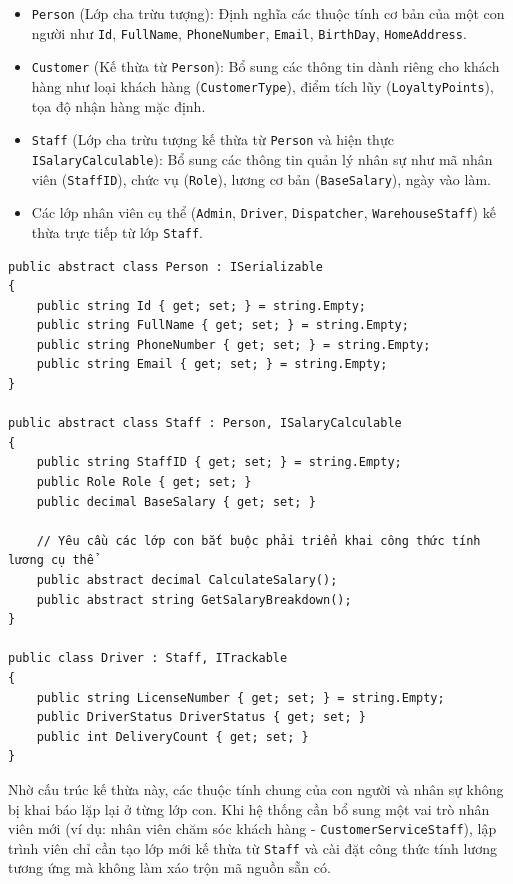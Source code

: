 \documentclass[12pt,a4paper]{article}
\begin{document}
\begin{itemize}[leftmargin=1.2cm]
    \item \texttt{Person} (Lớp cha trừu tượng): Định nghĩa các thuộc tính cơ bản của một con người như \texttt{Id}, \texttt{FullName}, \texttt{PhoneNumber}, \texttt{Email}, \texttt{BirthDay}, \texttt{HomeAddress}.
    \item \texttt{Customer} (Kế thừa từ \texttt{Person}): Bổ sung các thông tin dành riêng cho khách hàng như loại khách hàng (\texttt{CustomerType}), điểm tích lũy (\texttt{LoyaltyPoints}), tọa độ nhận hàng mặc định.
    \item \texttt{Staff} (Lớp cha trừu tượng kế thừa từ \texttt{Person} và hiện thực \texttt{ISalaryCalculable}): Bổ sung các thông tin quản lý nhân sự như mã nhân viên (\texttt{StaffID}), chức vụ (\texttt{Role}), lương cơ bản (\texttt{BaseSalary}), ngày vào làm.
    \item Các lớp nhân viên cụ thể (\texttt{Admin}, \texttt{Driver}, \texttt{Dispatcher}, \texttt{WarehouseStaff}) kế thừa trực tiếp từ lớp \texttt{Staff}.
\end{itemize}

\begin{listing}[H]
\caption{Khai báo cây phân cấp kế thừa nhóm nhân sự}
\begin{verbatim}
public abstract class Person : ISerializable
{
    public string Id { get; set; } = string.Empty;
    public string FullName { get; set; } = string.Empty;
    public string PhoneNumber { get; set; } = string.Empty;
    public string Email { get; set; } = string.Empty;
}

public abstract class Staff : Person, ISalaryCalculable
{
    public string StaffID { get; set; } = string.Empty;
    public Role Role { get; set; }
    public decimal BaseSalary { get; set; }
    
    // Yêu cầu các lớp con bắt buộc phải triển khai công thức tính lương cụ thể
    public abstract decimal CalculateSalary();
    public abstract string GetSalaryBreakdown();
}

public class Driver : Staff, ITrackable
{
    public string LicenseNumber { get; set; } = string.Empty;
    public DriverStatus DriverStatus { get; set; }
    public int DeliveryCount { get; set; }
}
\end{verbatim}
\end{listing}

Nhờ cấu trúc kế thừa này, các thuộc tính chung của con người và nhân sự không bị khai báo lặp lại ở từng lớp con. Khi hệ thống cần bổ sung một vai trò nhân viên mới (ví dụ: nhân viên chăm sóc khách hàng - \texttt{CustomerServiceStaff}), lập trình viên chỉ cần tạo lớp mới kế thừa từ \texttt{Staff} và cài đặt công thức tính lương tương ứng mà không làm xáo trộn mã nguồn sẵn có.
\end{document}
